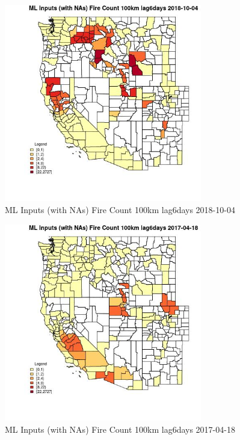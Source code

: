 \clearpage 

\begin{figure} 
\centering  
\includegraphics[width=0.77\textwidth]{Code_Outputs/Report_ML_input_PM25_Step4_part_f_de_duplicated_aveswNAs_CountyFire_Count_100km_lag6daysMean2018-10-04.jpg} 
\caption{\label{fig:Report_ML_input_PM25_Step4_part_f_de_duplicated_aveswNAsCountyFire_Count_100km_lag6daysMean2018-10-04}ML Inputs (with NAs) Fire Count 100km lag6days 2018-10-04} 
\end{figure} 
 

\begin{figure} 
\centering  
\includegraphics[width=0.77\textwidth]{Code_Outputs/Report_ML_input_PM25_Step4_part_f_de_duplicated_aveswNAs_CountyFire_Count_100km_lag6daysMean2017-04-18.jpg} 
\caption{\label{fig:Report_ML_input_PM25_Step4_part_f_de_duplicated_aveswNAsCountyFire_Count_100km_lag6daysMean2017-04-18}ML Inputs (with NAs) Fire Count 100km lag6days 2017-04-18} 
\end{figure} 
 

